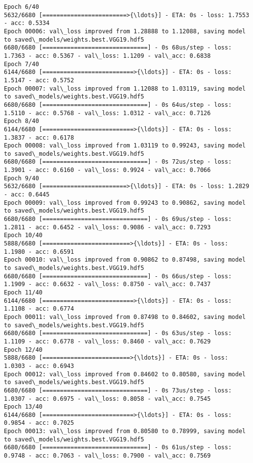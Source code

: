\documentclass[11pt]{article}
\begin{document}
\begin{Verbatim}[commandchars=\\\{\}]
Epoch 6/40
5632/6680 [========================>{\ldots}] - ETA: 0s - loss: 1.7553 - acc: 0.5334
Epoch 00006: val\_loss improved from 1.28888 to 1.12088, saving model to saved\_models/weights.best.VGG19.hdf5
6680/6680 [==============================] - 0s 68us/step - loss: 1.7363 - acc: 0.5367 - val\_loss: 1.1209 - val\_acc: 0.6838
Epoch 7/40
6144/6680 [==========================>{\ldots}] - ETA: 0s - loss: 1.5147 - acc: 0.5752
Epoch 00007: val\_loss improved from 1.12088 to 1.03119, saving model to saved\_models/weights.best.VGG19.hdf5
6680/6680 [==============================] - 0s 64us/step - loss: 1.5110 - acc: 0.5768 - val\_loss: 1.0312 - val\_acc: 0.7126
Epoch 8/40
6144/6680 [==========================>{\ldots}] - ETA: 0s - loss: 1.3837 - acc: 0.6178
Epoch 00008: val\_loss improved from 1.03119 to 0.99243, saving model to saved\_models/weights.best.VGG19.hdf5
6680/6680 [==============================] - 0s 72us/step - loss: 1.3901 - acc: 0.6160 - val\_loss: 0.9924 - val\_acc: 0.7066
Epoch 9/40
5632/6680 [========================>{\ldots}] - ETA: 0s - loss: 1.2829 - acc: 0.6445
Epoch 00009: val\_loss improved from 0.99243 to 0.90862, saving model to saved\_models/weights.best.VGG19.hdf5
6680/6680 [==============================] - 0s 69us/step - loss: 1.2811 - acc: 0.6452 - val\_loss: 0.9086 - val\_acc: 0.7293
Epoch 10/40
5888/6680 [=========================>{\ldots}] - ETA: 0s - loss: 1.1980 - acc: 0.6591
Epoch 00010: val\_loss improved from 0.90862 to 0.87498, saving model to saved\_models/weights.best.VGG19.hdf5
6680/6680 [==============================] - 0s 66us/step - loss: 1.1909 - acc: 0.6632 - val\_loss: 0.8750 - val\_acc: 0.7437
Epoch 11/40
6144/6680 [==========================>{\ldots}] - ETA: 0s - loss: 1.1108 - acc: 0.6774
Epoch 00011: val\_loss improved from 0.87498 to 0.84602, saving model to saved\_models/weights.best.VGG19.hdf5
6680/6680 [==============================] - 0s 63us/step - loss: 1.1109 - acc: 0.6778 - val\_loss: 0.8460 - val\_acc: 0.7629
Epoch 12/40
5888/6680 [=========================>{\ldots}] - ETA: 0s - loss: 1.0303 - acc: 0.6943
Epoch 00012: val\_loss improved from 0.84602 to 0.80580, saving model to saved\_models/weights.best.VGG19.hdf5
6680/6680 [==============================] - 0s 73us/step - loss: 1.0307 - acc: 0.6975 - val\_loss: 0.8058 - val\_acc: 0.7545
Epoch 13/40
6144/6680 [==========================>{\ldots}] - ETA: 0s - loss: 0.9854 - acc: 0.7025
Epoch 00013: val\_loss improved from 0.80580 to 0.78999, saving model to saved\_models/weights.best.VGG19.hdf5
6680/6680 [==============================] - 0s 61us/step - loss: 0.9748 - acc: 0.7063 - val\_loss: 0.7900 - val\_acc: 0.7569

\end{Verbatim}
\end{document}
